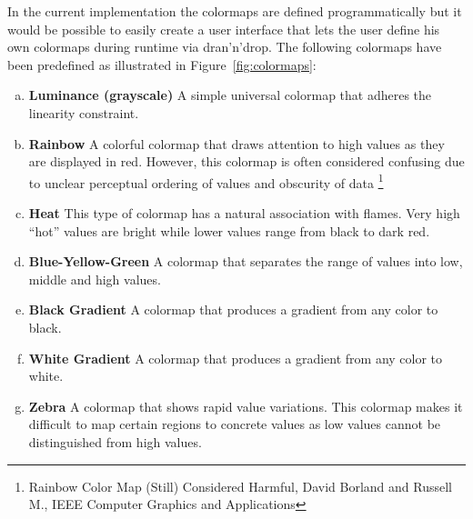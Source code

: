 In the current implementation the colormaps are defined programmatically but it would be possible to easily create a user interface that lets the user define his own colormaps during runtime via dran'n'drop. The following colormaps have been predefined as illustrated in Figure~\ref{fig:colormaps}:
\begin{enumerate}[(a)]
    \item \textbf{Luminance (grayscale)} A simple universal colormap that adheres the linearity constraint. 
    \item \textbf{Rainbow} A colorful colormap that draws attention to high values as they are displayed in red. However, this colormap is often considered confusing due to unclear perceptual ordering of values and obscurity of data \footnote{Rainbow Color Map (Still) Considered Harmful, David Borland and Russell M., IEEE Computer Graphics and Applications} 
    \item \textbf{Heat} This type of colormap has a natural association with flames. Very high ``hot'' values are bright while lower values range from black to dark red.  
    \item \textbf{Blue-Yellow-Green} A colormap that separates the range of values into low, middle and high values. 
    \item \textbf{Black Gradient} A colormap that produces a gradient from any color to black.
    \item \textbf{White Gradient} A colormap that produces a gradient from any color to white.  
    \item \textbf{Zebra} A colormap that shows rapid value variations. This colormap makes it difficult to map certain regions to concrete values as low values cannot be distinguished from high values. 
\end{enumerate}   

